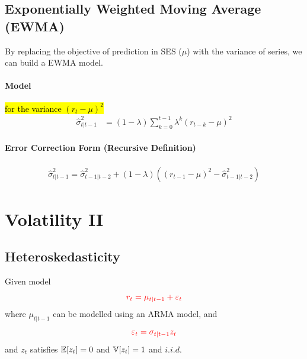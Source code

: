 \documentclass[11pt]{article}
\begin{document}
		\subsection{Exponentially Weighted Moving Average (EWMA)}
			\begin{remark}
				By replacing the objective of prediction in SES ($\mu$) with the variance of series, we can build a EWMA model. 
			\end{remark}
			
			\paragraph{Model} \hl{for the variance $(r_t - \mu)^2$}
				\begin{align}
					\hat{\sigma}^2_{t|t-1} &= (1 - \lambda) \sum_{k=0}^{t-1} \lambda^k (r_{t-k} - \mu)^2 
				\end{align}
				
			\paragraph{Error Correction Form (Recursive Definition)}
				\begin{gather}
					\hat{\sigma}_{t|t-1}^2 = \hat{\sigma}_{t-1|t-2}^2 + (1 - \lambda) ((r_{t-1} - \mu)^2 - \hat{\sigma}_{t-1|t-2}^2)
				\end{gather}

				
	
	\section{Volatility II}
	    \subsection{Heteroskedasticity}
	        \begin{definition}
	            Given model
	            \begin{equation}
	                \textcolor{red}{r_t = \mu_{t|t-1} + \varepsilon_t}
	            \end{equation}
	            where $\mu_{t|t-1}$ can be modelled using an ARMA model, and 
	            \begin{equation}
	                \textcolor{red}{\varepsilon_t = \sigma_{t|t-1} z_t}
	            \end{equation}
	            and $z_t$ satisfies $\mathbb{E}[{z_t}] = 0$ and $\mathbb{V}[{z_t}] = 1$ and $i.i.d.$
	        \end{definition}
	        
\end{document}
